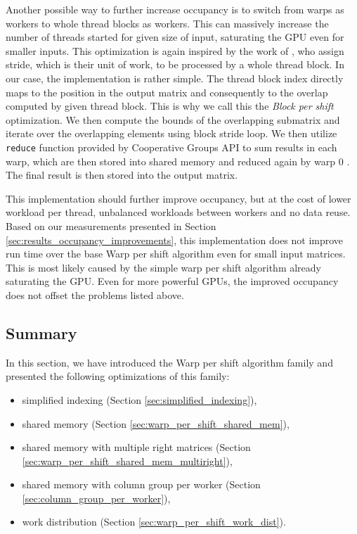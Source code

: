 Another possible way to further increase occupancy is to switch from warps as workers to whole thread blocks as workers. This can massively increase the number of threads started for given size of input, saturating the GPU even for smaller inputs. This optimization is again inspired by the work of \citet{paper:levenstein}, who assign stride, which is their unit of work, to be processed by a whole thread block. In our case, the implementation is rather simple. The thread block index directly maps to the position in the output matrix and consequently to the overlap computed by given thread block. This is why we call this the \textit{Block per shift} optimization. We then compute the bounds of the overlapping submatrix and iterate over the overlapping elements using block stride loop. We then utilize \texttt{reduce} function provided by Cooperative Groups API to sum results in each warp, which are then stored into shared memory and reduced again by warp 0 \citep{site:cuda_reduction}. The final result is then stored into the output matrix. 

This implementation should further improve occupancy, but at the cost of lower workload per thread, unbalanced workloads between workers and no data reuse. Based on our measurements presented in Section \ref{sec:results_occupancy_improvements}, this implementation does not improve run time over the base Warp per shift algorithm even for small input matrices. This is most likely caused by the simple warp per shift algorithm already saturating the GPU. Even for more powerful GPUs, the improved occupancy does not offset the problems listed above.

\subsection{Summary}

In this section, we have introduced the Warp per shift algorithm family and presented the following optimizations of this family:
\begin{itemize}
	\item simplified indexing (Section \ref{sec:simplified_indexing}),
	\item shared memory (Section \ref{sec:warp_per_shift_shared_mem}),
	\item shared memory with multiple right matrices (Section \ref{sec:warp_per_shift_shared_mem_multiright}),
	\item shared memory with column group per worker (Section \ref{sec:column_group_per_worker}),
	\item work distribution (Section \ref{sec:warp_per_shift_work_dist}).
\end{itemize}

